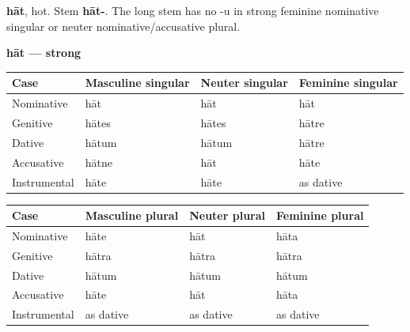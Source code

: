 \textbf{hāt}, hot. Stem \textbf{hāt-}. The long stem has no -u in strong feminine nominative singular or neuter nominative/\allowbreak{}accusative plural.

\textbf{hāt — strong}

\par\begingroup
\fontsize{10.5}{13.2}\selectfont
\setlength{\LTleft}{0pt}\setlength{\LTright}{\fill}
\noindent
\begin{tabular}{@{}>{\raggedright\arraybackslash}p{22.0mm}>{\raggedright\arraybackslash}p{31.188mm}>{\raggedright\arraybackslash}p{31.188mm}>{\raggedright\arraybackslash}p{31.188mm}@{}}
\toprule
\textbf{Case} & \textbf{Masculine singular} & \textbf{Neuter singular} & \textbf{Feminine singular} \\
\midrule
Nominative & hāt & hāt & hāt \\
Genitive & hātes & hātes & hātre \\
Dative & hātum & hātum & hātre \\
Accusative & hātne & hāt & hāte \\
Instrumental & hāte & hāte & as dative \\
\bottomrule
\end{tabular}
\par\endgroup
\par\addvspace{5pt}
\par\begingroup
\fontsize{10.5}{13.2}\selectfont
\setlength{\LTleft}{0pt}\setlength{\LTright}{\fill}
\noindent
\begin{tabular}{@{}>{\raggedright\arraybackslash}p{22.0mm}>{\raggedright\arraybackslash}p{31.188mm}>{\raggedright\arraybackslash}p{31.188mm}>{\raggedright\arraybackslash}p{31.188mm}@{}}
\toprule
\textbf{Case} & \textbf{Masculine plural} & \textbf{Neuter plural} & \textbf{Feminine plural} \\
\midrule
Nominative & hāte & hāt & hāta \\
Genitive & hātra & hātra & hātra \\
Dative & hātum & hātum & hātum \\
Accusative & hāte & hāt & hāta \\
Instrumental & as dative & as dative & as dative \\
\bottomrule
\end{tabular}
\par\endgroup

